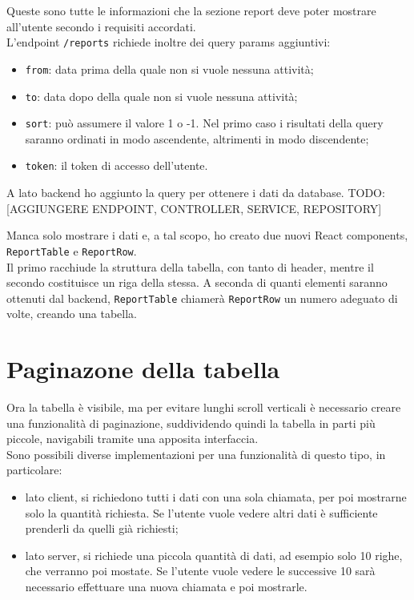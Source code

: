 Queste sono tutte le informazioni che la sezione report deve poter mostrare all'utente secondo i requisiti accordati.\\
L'endpoint \texttt{/reports} richiede inoltre dei query params aggiuntivi:
\begin{itemize}
  \item \texttt{from}: data prima della quale non si vuole nessuna attività;
  \item \texttt{to}: data dopo della quale non si vuole nessuna attività;
  \item \texttt{sort}: può assumere il valore 1 o -1. Nel primo caso i risultati della query saranno ordinati in modo ascendente, altrimenti in modo discendente;
  \item \texttt{token}: il token di accesso dell'utente.
\end{itemize}

A lato backend ho aggiunto la query per ottenere i dati da database. TODO: [AGGIUNGERE ENDPOINT, CONTROLLER, SERVICE, REPOSITORY]

Manca solo mostrare i dati e, a tal scopo, ho creato due nuovi React components, \texttt{ReportTable} e \texttt{ReportRow}.\\
Il primo racchiude la struttura della tabella, con tanto di header, mentre il secondo costituisce un riga della stessa. A seconda di quanti elementi saranno ottenuti dal backend, \texttt{ReportTable} chiamerà \texttt{ReportRow} un numero adeguato di volte, creando una tabella.

\section{Paginazone della tabella}

Ora la tabella è visibile, ma per evitare lunghi scroll verticali è necessario creare una funzionalità di paginazione, suddividendo quindi la tabella in parti più piccole, navigabili tramite una apposita interfaccia.\\
Sono possibili diverse implementazioni per una funzionalità di questo tipo, in particolare:
\begin{itemize}
  \item lato client, si richiedono tutti i dati con una sola chiamata, per poi mostrarne solo la quantità richiesta. Se l'utente vuole vedere altri dati è sufficiente prenderli da quelli già richiesti;
  \item lato server, si richiede una piccola quantità di dati, ad esempio solo 10 righe, che verranno poi mostate. Se l'utente vuole vedere le successive 10 sarà necessario effettuare una nuova chiamata e poi mostrarle. 
\end{itemize}

